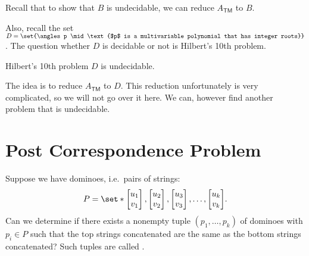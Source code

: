 \documentclass{standalone}
\begin{document}
Recall that to show that \(B\) is undecidable,
we can reduce \(A_{\textsf{TM}}\) to \(B\).

Also, recall the set
\(D = \set{\angles p \mid
           \text{$p$ is a multivariable polynomial that has integer roots}}\).
The question whether \(D\) is decidable or not is Hilbert's 10th problem.

\begin{proposition}[Matiyasevich, 1971]
  Hilbert's 10th problem \(D\) is undecidable.
\end{proposition}
The idea is to reduce \(A_{\textsf{TM}}\) to \(D\).
This reduction unfortunately is very complicated,
so we will not go over it here.
We can, however find another problem that is undecidable.

\section{Post Correspondence Problem}
Suppose we have dominoes, i.e.\ pairs of strings:
\[
  P = \set*{
    \begin{bmatrix} u_1 \\ v_1 \end{bmatrix},
    \begin{bmatrix} u_2 \\ v_2 \end{bmatrix},
    \begin{bmatrix} u_3 \\ v_3 \end{bmatrix}, \dots,
    \begin{bmatrix} u_k \\ v_k \end{bmatrix}
  }.
\]
Can we determine if there exists a nonempty tuple
\((p_1, \dots, p_k)\) of dominoes with \(p_i \in P\) such that
the top strings concatenated are the same as the bottom strings concatenated?
Such tuples are called .
\end{document}
